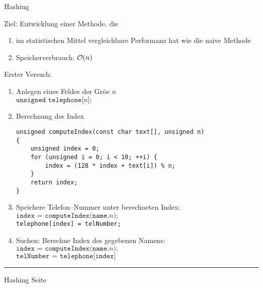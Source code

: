 \begin{slide}{}
\normalsize

\begin{center}
Hashing
\end{center}
\vspace*{0.5cm}

\footnotesize
Ziel: Entwicklung einer Methode, die 
\begin{enumerate}
\item im statistischen Mittel vergleichbare Performanz hat wie die naive Methode
\item Speicherverbrauch: $\mathcal{O}(n)$
\end{enumerate}

Erster Versuch:
\begin{enumerate}
\item Anlegen eines Feldes der Gr\"o\3e $n$ \\[0.3cm]
      \hspace*{1.3cm} $\texttt{unsigned telephone[}n\mathtt{];}$
\item Berechnung des Index
\begin{verbatim} 
unsigned computeIndex(const char text[], unsigned n) 
{
    unsigned index = 0;
    for (unsigned i = 0; i < 10; ++i) {
        index = (128 * index + text[i]) % n;
    }
    return index;
}
\end{verbatim}
\item Speichere Telefon--Nummer unter berechneten Index: \\[0.3cm]
      \hspace*{1.3cm} $\texttt{index = computeIndex(name,} n\mathtt{);}$ \\[0.3cm]
      \hspace*{1.3cm} \texttt{telephone[index] = telNumber;}
\item Suchen: Berechne Index des gegebenen Namens: \\[0.3cm]
      \hspace*{1.3cm} $\texttt{index = computeIndex(name,} n\mathtt{);}$ \\[0.3cm]
      \hspace*{1.3cm} $\texttt{telNumber = telephone[index]}$
\end{enumerate}

\vspace*{\fill}
\tiny \addtocounter{mypage}{1}
\rule{17cm}{1mm}
Hashing  \hspace*{\fill} Seite 
\end{slide}

